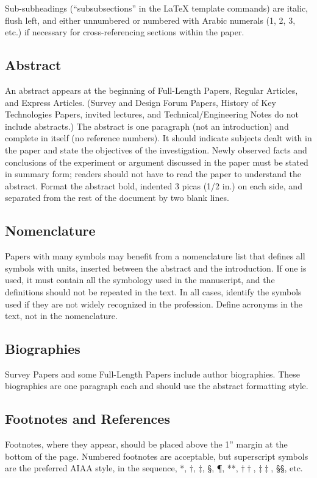 \documentclass[journal ]{new-aiaa}
\begin{document}
Sub-subheadings (``subsubsections'' in the \LaTeX{} template commands) are italic, flush left, and either unnumbered or numbered with Arabic numerals (1, 2, 3, etc.) if necessary for cross-referencing sections within the paper.


\subsection{Abstract}
An abstract appears at the beginning of Full-Length Papers, Regular Articles, and Express Articles. (Survey and Design Forum Papers, History of Key Technologies Papers, invited lectures, and Technical/Engineering Notes do not include abstracts.) The abstract is one paragraph (not an introduction) and complete in itself (no reference numbers). It should indicate subjects dealt with in the paper and state the objectives of the investigation. Newly observed facts and conclusions of the experiment or argument discussed in the paper must be stated in summary form; readers should not have to read the paper to understand the abstract. Format the abstract bold, indented 3 picas (1/2 in.) on each side, and separated from the rest of the document by two blank lines.


\subsection{Nomenclature}
Papers with many symbols may benefit from a nomenclature list that defines all symbols with units, inserted between the abstract and the introduction. If one is used, it must contain all the symbology used in the manuscript, and the definitions should not be repeated in the text. In all cases, identify the symbols used if they are not widely recognized in the profession. Define acronyms in the text, not in the nomenclature. 

\subsection{Biographies}
Survey Papers and some Full-Length Papers include author biographies. These biographies are one paragraph each and should use the abstract formatting style.

\subsection{Footnotes and References}
Footnotes, where they appear, should be placed above the 1'' margin at the bottom of the page. Numbered footnotes are acceptable, but superscript symbols are the preferred AIAA style, in the sequence, *, $\dag$, $\ddag$, \S, \P, **, $\dag\dag$, $\ddag\ddag$, \S\S, etc.
\end{document}
